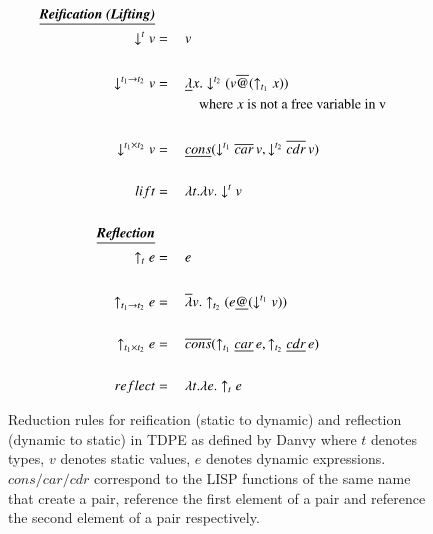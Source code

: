 \documentclass[a4paper,12pt,twoside,openright]{report}
\theoremstyle{definition}
\begin{document}
\begin{figure}[htp!]
    \centering
    \begin{alignat}{2}
        \text{\underline{\textbf{\emph{Reification (Lifting)}}}}\nonumber \\
        \downarrow^{t} v & = \: && v \\
        \nonumber \\%
        \downarrow^{t_{1} \rightarrow t_{2}} v & = \: && \underline{\lambda} x.\downarrow^{t_{2}}(v\overline{@}(\uparrow_{t_{1}} x)) \\
        & && \quad\text{where $x$ is not a free variable in v} \nonumber \\
        \nonumber \\%
        \downarrow^{t_{1} \times t_{2}} v & = \: && \underline{cons}(\downarrow^{t_{1}} \overline{car} \, v, \downarrow^{t_{2}} \overline{cdr} \, v) \\
        \nonumber \\%
        lift & = \: && \lambda t. \lambda v. \downarrow^{t} v \\
        \nonumber \\%
        \text{\underline{\textbf{\emph{Reflection}}}}\nonumber \\
        \uparrow_{t} e & = \: && e \\
        \nonumber \\%
        \uparrow_{t_{1} \rightarrow t_{2}} e & = \: && \overline{\lambda} v.\uparrow_{t_{2}}(e\underline{@}(\downarrow^{t_{1}} v)) \\
        \nonumber \\%
        \uparrow_{t_{1} \times t_{2}} e & = \: && \overline{cons}(\uparrow_{t_{1}} \underline{car} \, e, \uparrow_{t_{2}} \underline{cdr} \, e) \\
        \nonumber \\%
        reflect & = \: && \lambda t. \lambda e. \uparrow_{t} e
    \end{alignat}
    \caption{Reduction rules for reification (static to dynamic) and reflection (dynamic to static) in TDPE as defined by Danvy \cite{danvy1999type} where $t$ denotes types, $v$ denotes static values, $e$ denotes dynamic expressions. $cons/car/cdr$ correspond to the LISP functions of the same name that create a pair, reference the first element of a pair and reference the second element of a pair respectively.}
    \label{fig:tdpe_rules}
\end{figure}
\end{document}
